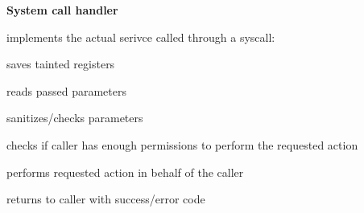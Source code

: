 \textbf{System call handler}
\begin{items}
  \item implements the actual serivce called through a syscall:
  \begin{enumeration}
    \item saves tainted registers
    \item reads passed parameters
    \item sanitizes/checks parameters
    \item checks if caller has enough permissions to perform the requested action
    \item performs requested action in behalf of the caller
    \item returns to caller with success/error code
  \end{enumeration}
\end{items}